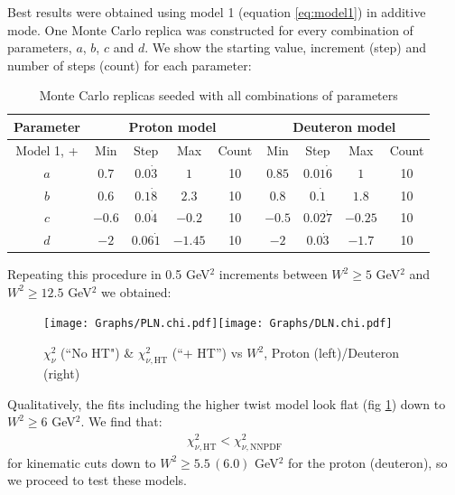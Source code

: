 \documentclass[12pt,a4paper]{report}
\begin{document}
Best results were obtained using model 1 (equation \ref{eq:model1}) in additive mode. One Monte Carlo replica was constructed for every combination of parameters, $a$, $b$, $c$ and $d$. We show the starting value, increment (step) and number of steps (count) for each parameter:
\begin{table}[H]
\begin{center}
\begin{tabular}{|c|cccc|cccc|}
\hline
Parameter &\multicolumn{4}{c|}{Proton model}&\multicolumn{4}{c|}{Deuteron model}\\
\hline
Model 1, + & Min & Step & Max & Count & Min & Step & Max & Count\\
\hline
$a$ & $0.7$ & $0.0\dot{3}$ & $1$ & 10       & $0.85$ & $0.01\dot{6}$ & $1$ & 10\\
$b$ & $0.6$ & $0.1\dot{8}$ & $2.3$ & 10    & $0.8$ & $0.\dot{1}$ & $1.8$ & 10\\
$c$ & $-0.6$ & $0.0\dot{4}$ & $-0.2$ & 10  & $-0.5$ & $0.02\dot{7}$ & $-0.25$ & 10\\
$d$ & $-2$ & $0.06\dot{1}$ & $-1.45$ & 10 & $-2$ & $0.0\dot{3}$ & $-1.7$ & 10\\
\hline
\end{tabular}
\caption{Monte Carlo replicas seeded with all combinations of parameters}
\label{tb:res_params}
\end{center}
\end{table}

Repeating this procedure in 0.5 GeV$^2$ increments between $W^2 \ge 5 $ GeV$^2$ and $W^2 \ge 12.5$ GeV$^2$ we obtained:

\begin{figure}[H]
\begin{center}
\texttt{[image: Graphs/PLN.chi.pdf]}\texttt{[image: Graphs/DLN.chi.pdf]}
\caption{$\chi_\nu^2$ (``No HT") \& $\chi_{\nu,\textrm{HT}}^2$ (``+ HT'') vs $W^2$, Proton (left)/Deuteron (right)}
\label{fig:res_model_create}
\end{center}
\end{figure}

Qualitatively, the fits including the higher twist model look flat (fig \ref{fig:res_model_create}) down to $W^2 \ge 6$ GeV$^2$. We find that:
\begin{align}
\chi_{\nu,\textrm{HT}}^2 < \chi_{\nu,\textrm{NNPDF}}^2
\end{align}
for kinematic cuts down to $W^2 \ge 5.5 \, (6.0)$ GeV$^2$ for the proton (deuteron), so we proceed to test these models.
\end{document}
